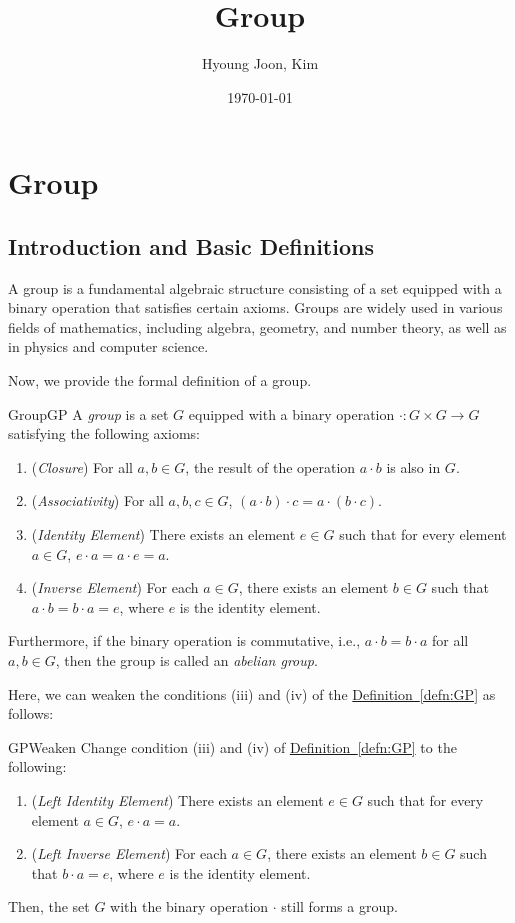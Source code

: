 \documentclass{article}
\title{Group}
\author{Hyoung Joon, Kim}
\date{\today}
\begin{document}
\maketitle
\tableofcontents

\newpage

\section{Group}
\subsection{Introduction and Basic Definitions}
A group is a fundamental algebraic structure consisting of a set equipped with a binary operation that satisfies certain axioms. Groups are widely used in various fields of mathematics, including algebra, geometry, and number theory, as well as in physics and computer science.


Now, we provide the formal definition of a group.
\begin{defn}{Group}{GP}
A \emph{group} is a set \( G \) equipped with a binary operation
\(\cdot : G \times G \to G\) satisfying the following axioms:
\begin{enumerate}[label=(\roman*)]
    \item (\emph{Closure}) For all \( a, b \in G \), the result of the operation \( a \cdot b \) is also in \( G \).
    \item (\emph{Associativity}) For all \( a, b, c \in G \), \( (a \cdot b) \cdot c = a \cdot (b \cdot c) \).
    \item (\emph{Identity Element}) There exists an element \( e \in G \) such that for every element \( a \in G \), \( e \cdot a = a \cdot e = a \).
    \item (\emph{Inverse Element}) For each \( a \in G \), there exists an element \( b \in G \) such that \( a \cdot b = b \cdot a = e \), where \( e \) is the identity element.
\end{enumerate}
Furthermore, if the binary operation is commutative, i.e., \(a \cdot b = b \cdot a\) for all \(a, b \in G\), then the group is called an \emph{abelian group}.
\end{defn}

Here, we can weaken the conditions (iii) and (iv) of the \hyperref[defn:GP]{Definition~\ref{defn:GP}} as follows:
\begin{rem}{}{GPWeaken}
Change condition (iii) and (iv) of \hyperref[defn:GP]{Definition~\ref{defn:GP}} to the following:
\begin{enumerate}[label=(\roman*)]
    \item[(iii)$'$] (\emph{Left Identity Element}) There exists an element \( e \in G \) such that for every element \( a \in G \), \( e \cdot a = a \).
    \item[(iv)$'$] (\emph{Left Inverse Element}) For each \( a \in G \), there exists an element \( b \in G \) such that \( b \cdot a = e \), where \( e \) is the identity element.
\end{enumerate}
Then, the set \( G \) with the binary operation \(\cdot\) still forms a group.
\end{rem}
\end{document}
